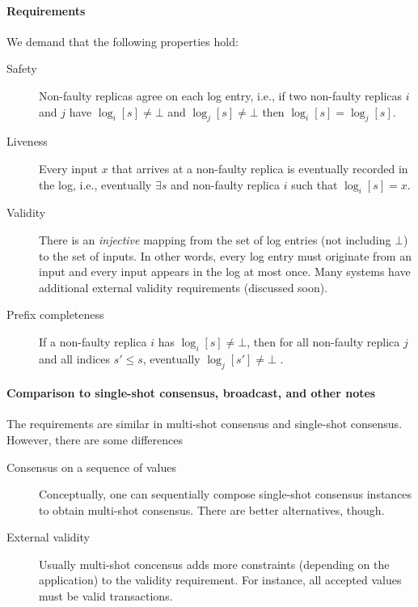 \paragraph{Requirements}
We demand that the following properties hold:
\begin{description}
    \item[Safety] Non-faulty replicas agree on 
    each log entry, i.e., if two non-faulty replicas $i$ and $j$ have 
    $\log_i[s] \ne\bot$ and $\log_j[s]\ne\bot$ then $\log_i[s] = \log_j[s]$.

    \item[Liveness] Every input $x$ that arrives at 
    a non-faulty replica is eventually recorded in the log,
     i.e., eventually $\exists s$ and non-faulty replica $i$ such that $\log_i[s]=x$.

    \item[Validity] There is an \emph{injective} mapping from the set of 
    log entries (not including $\bot$) to the set of inputs.
    In other words, every log entry must originate from an input and 
    every input appears in the log at most once. 
    Many systems have additional external validity requirements (discussed soon).

    \item[Prefix completeness]
    If a non-faulty replica $i$ has $\log_i[s] \ne\bot$,
    then for all non-faulty replica $j$ and all indices $s'\le s$,
    eventually $\log_j[s'] \ne\bot$ .

\end{description}


\paragraph{Comparison to single-shot consensus, broadcast, and other notes}
The requirements are similar in multi-shot consensus and 
single-shot consensus. However, there are some differences
\begin{description}
    \item[Consensus on a sequence of values] Conceptually, one can sequentially
    compose single-shot consensus instances to obtain multi-shot consensus.
    There are better alternatives, though.

    \item[External validity] Usually multi-shot concensus adds more constraints 
    (depending on the application) to the validity requirement. 
    For instance, all accepted values must be valid transactions.
\end{description}


